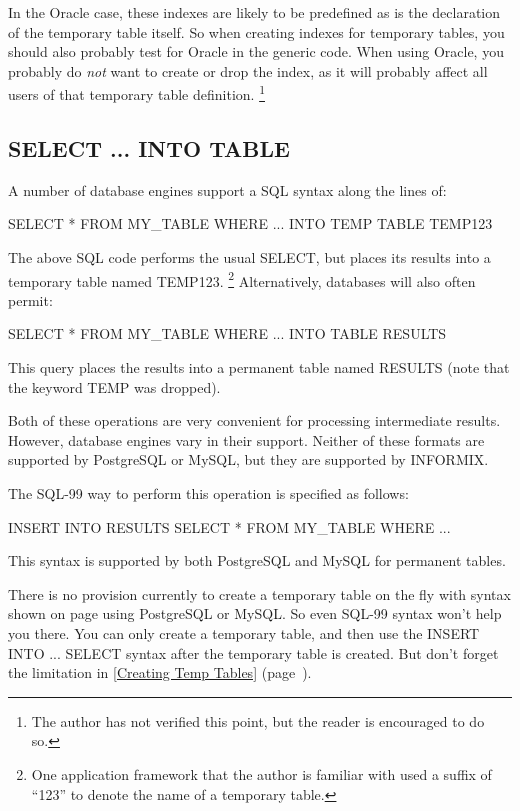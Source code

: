 \documentclass[english,letterpaper]{book}
\newcommand\Ref[1]{\textsection\ref{#1} (page~\pageref{#1})}
\begin{document}
In the Oracle case, these indexes are likely to be predefined as is
the declaration of the temporary table itself. So when creating indexes
for temporary tables, you should also probably test for Oracle in
the generic code. When using Oracle, you probably do \emph{not} want
to create or drop the index, as it will probably affect all users
of that temporary table definition.%
\footnote{The author has not verified this point, but the reader is encouraged
to do so.%
}

\subsection{SELECT ... INTO TABLE}

A number of database engines support a SQL syntax along the lines
of:

\label{SelectIntoTempTable}
\begin{SQL}
SELECT *
FROM MY_TABLE
WHERE ...
INTO TEMP TABLE TEMP123
\end{SQL}

The above SQL code performs the usual SELECT, but places its results
into a temporary table named TEMP123. \footnote{One application
framework that the author is familiar with used a suffix of ``123'' to
denote the name of a temporary table.} Alternatively, databases will
also often permit:

\begin{SQL}
SELECT *
FROM MY_TABLE
WHERE ...
INTO TABLE RESULTS
\end{SQL}

This query places the results into a permanent table named RESULTS
(note that the keyword TEMP was dropped).

Both of these operations are very convenient for processing intermediate
results. However, database engines vary in their support. Neither
of these formats are supported by PostgreSQL or MySQL, but they are
supported by INFORMIX.

The SQL-99 way to perform this operation is specified as follows:

\begin{SQL}
INSERT INTO RESULTS
SELECT *
FROM MY_TABLE
WHERE ...
\end{SQL}

This syntax is supported by both PostgreSQL and MySQL for permanent
tables.

There is no provision currently to create a temporary table on the
fly with syntax shown on page \pageref{SelectIntoTempTable}
using PostgreSQL or MySQL. So even SQL-99 syntax won't help you there.
You can only create a temporary table, and then use the INSERT INTO
... SELECT syntax after the temporary table is created. But don't
forget the limitation in \Ref{Creating Temp Tables}.
\end{document}

